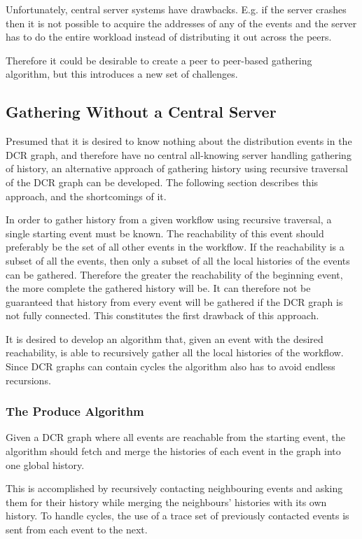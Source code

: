     \newpar Unfortunately, central server systems have drawbacks. E.g. if the server crashes then it is not possible to acquire the addresses of any of the events and the server has to do the entire workload instead of distributing it out across the peers.
    
    Therefore it could be desirable to create a peer to peer-based gathering algorithm, but this introduces a new set of challenges.
    
    \subsection{Gathering Without a Central Server}
	Presumed that it is desired to know nothing about the distribution events in the DCR graph, and therefore have no central all-knowing server handling gathering of history, an alternative approach of gathering history using recursive traversal of the DCR graph can be developed. The following section describes this approach, and the shortcomings of it. 
	
	\newpar In order to gather history from a given workflow using recursive traversal, a single starting event must be known. The reachability of this event should preferably be the set of all other events in the workflow. If the reachability is a subset of all the events, then only a subset of all the local histories of the events can be gathered. Therefore the greater the reachability of the beginning event, the more complete the gathered history will be. It can therefore not be guaranteed that history from every event will be gathered if the DCR graph is not fully connected. This constitutes the first drawback of this approach.
	
	It is desired to develop an algorithm that, given an event with the desired reachability, is able to recursively gather all the local histories of the workflow. Since DCR graphs can contain cycles the algorithm also has to avoid endless recursions.
		
	\subsubsection{The Produce Algorithm}
	Given a DCR graph where all events are reachable from the starting event, the algorithm should fetch and merge the histories of each event in the graph into one global history.
	
	This is accomplished by recursively contacting neighbouring events and asking them for their history while merging the neighbours' histories with its own history. To handle cycles, the use of a trace set of previously contacted events is sent from each event to the next.
	
